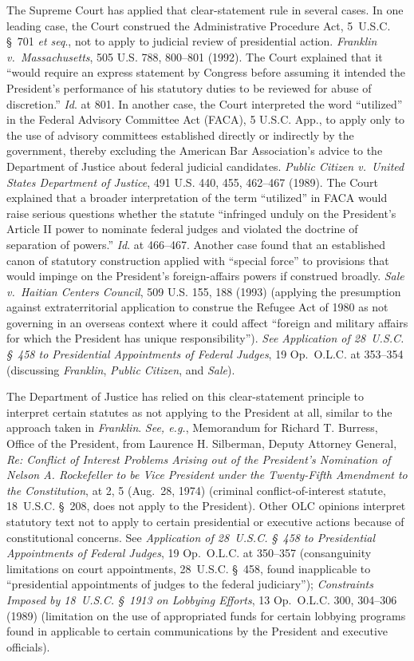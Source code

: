 The Supreme Court has applied that clear-statement rule in several cases.
In one leading case, the Court construed the Administrative Procedure Act, 5~U.S.C. \S~701 \textit{et seq}., not to apply to judicial review of presidential action.
\textit{Franklin v.\ Massachusetts}, 505 U.S. 788, 800--801 (1992).
The Court explained that it ``would require an express statement by Congress before assuming it intended the President's performance of his statutory duties to be reviewed for abuse of discretion.''
\textit{Id}. at 801.
In another case, the Court interpreted the word ``utilized'' in the Federal Advisory Committee Act (FACA), 5 U.S.C. App., to apply only to the use of advisory committees established directly or indirectly by the government, thereby excluding the American Bar Association's advice to the Department of Justice about federal judicial candidates.
\textit{Public Citizen v.\ United States Department of Justice}, 491 U.S. 440, 455, 462--467 (1989).
The Court explained that a broader interpretation of the term ``utilized'' in FACA would raise serious questions whether the statute ``infringed unduly on the President's Article II power to nominate federal judges and violated the doctrine of separation of powers.''
\textit{Id}. at 466--467.
Another case found that an established canon of statutory construction applied with ``special force'' to provisions that would impinge on the President's foreign-affairs powers if construed broadly.
\textit{Sale v.\ Haitian Centers Council}, 509 U.S. 155, 188 (1993) (applying the presumption against extraterritorial application to construe the Refugee Act of 1980 as not governing in an overseas context where it could affect ``foreign and military affairs for which the President has unique responsibility'').
\textit{See Application of 28~U.S.C. \S~458 to Presidential Appointments of Federal Judges}, 19 Op.\ O.L.C. at 353--354 (discussing \textit{Franklin}, \textit{Public Citizen}, and \textit{Sale}).

The Department of Justice has relied on this clear-statement principle to interpret certain statutes as not applying to the President at all, similar to the approach taken in \textit{Franklin}.
\textit{See, e.g.}, Memorandum for Richard T. Burress, Office of the President, from Laurence H. Silberman, Deputy Attorney General, \textit{Re: Conflict of Interest Problems Arising out of the President's Nomination of Nelson A. Rockefeller to be Vice President under the Twenty-Fifth Amendment to the Constitution}, at 2, 5 (Aug.~28, 1974) (criminal conflict-of-interest statute, 18~U.S.C. \S~208, does not apply to the President).
Other OLC opinions interpret statutory text not to apply to certain presidential or executive actions because of constitutional concerns.
See \textit{Application of 28~U.S.C. \S~458 to Presidential Appointments of Federal Judges}, 19 Op.\ O.L.C. at 350--357 (consanguinity limitations on court appointments, 28~U.S.C. \S~458, found inapplicable to ``presidential appointments of judges to the federal judiciary'');
\textit{Constraints Imposed by 18~U.S.C. \S~1913 on Lobbying Efforts}, 13 Op.\ O.L.C. 300, 304--306 (1989) (limitation on the use of appropriated funds for certain lobbying programs found in applicable to certain communications by the President and executive officials).


